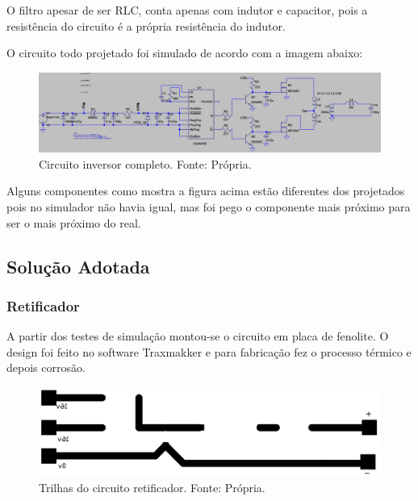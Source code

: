				O filtro apesar de ser RLC, conta apenas com indutor e capacitor, pois a 						resistência do circuito é a própria resistência do indutor.
				
				O circuito todo projetado foi simulado de acordo com a imagem abaixo:
				
                \begin{figure}[!htb]
            		\centering
            		\includegraphics[scale= 0.4]{figuras/Circuito_inversor.png}
            		\caption{Circuito inversor completo. Fonte: Própria.}
            		\label{inversor}
            	\end{figure} 
            					
				Alguns componentes como mostra a figura acima estão diferentes dos projetados 					pois no simulador não havia igual, mas foi pego o componente mais próximo para 				ser o mais próximo do real.          
             
        \subsection[Solução Adotada]{Solução Adotada}
            \subsubsection[Retificador]{Retificador} 
            	A partir dos testes de simulação montou-se o circuito em placa de fenolite. O 					design foi feito no software Traxmakker e para fabricação fez o processo 						térmico e depois corrosão.	
            	
                \begin{figure}[!htb]
            		\centering
            		\includegraphics[scale= 0.4]{figuras/Fenolite_Retificador.png}
            		\caption{Trilhas do circuito retificador. Fonte: Própria.}
            		\label{retificador-fenolite}
            	\end{figure}	
            	
